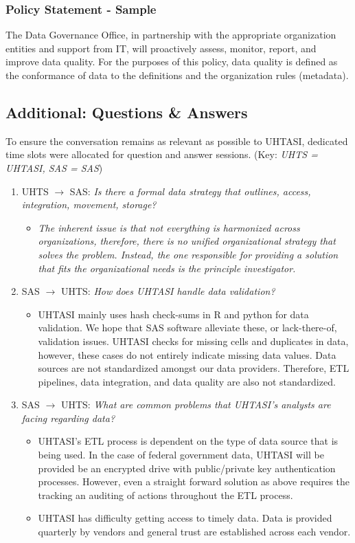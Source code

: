 \subsubsection{Policy Statement - Sample}
The Data Governance Office, in partnership with the appropriate organization entities and support from IT, will proactively assess, monitor, report, and improve data quality. For the purposes of this policy, data quality is defined as the conformance of data to the definitions and the organization rules (metadata).

\subsection{Additional: Questions \& Answers}

To ensure the conversation remains as relevant as possible to UHTASI, dedicated time slots were allocated for question and answer sessions. (Key: \textit{UHTS = UHTASI, SAS = SAS})

\begin{enumerate}
    \item UHTS $\rightarrow$ SAS: \textit{Is there a formal data strategy that outlines, access, integration, movement, storage?}
    \begin{itemize}
        \item \textit{The inherent issue is that not everything is harmonized across organizations, therefore, there is no unified organizational strategy that solves the problem. Instead, the one responsible for providing a solution that fits the organizational needs is the principle investigator.}
    \end{itemize}
    \item SAS $\rightarrow$ UHTS: \textit{How does UHTASI handle data validation?}
    \begin{itemize}
        \item UHTASI mainly uses hash check-sums in R and python for data validation. We hope that SAS software alleviate these, or lack-there-of, validation issues. UHTASI checks for missing cells and duplicates in data, however, these cases do not entirely indicate missing data values. Data sources are not standardized amongst our data providers. Therefore, ETL pipelines, data integration, and data quality are also not standardized.
    \end{itemize}
    \item SAS $\rightarrow$ UHTS: \textit{What are common problems that UHTASI's analysts are facing regarding data?}
    \begin{itemize}
        \item UHTASI's ETL process is dependent on the type of data source that is being used. In the case of federal government data, UHTASI will be provided be an encrypted drive with public/private key authentication processes. However, even a straight forward solution as above requires the tracking an auditing of actions throughout the ETL process. 
        \item UHTASI has difficulty getting access to timely data. Data is provided quarterly by vendors and general trust are established across each vendor.
    \end{itemize}
\end{enumerate}